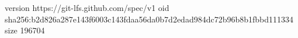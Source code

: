 version https://git-lfs.github.com/spec/v1
oid sha256:b2d826a287e143f6003c143fdaa56da0b7d2edad984dc72b96b8b1fbbd111334
size 196704
